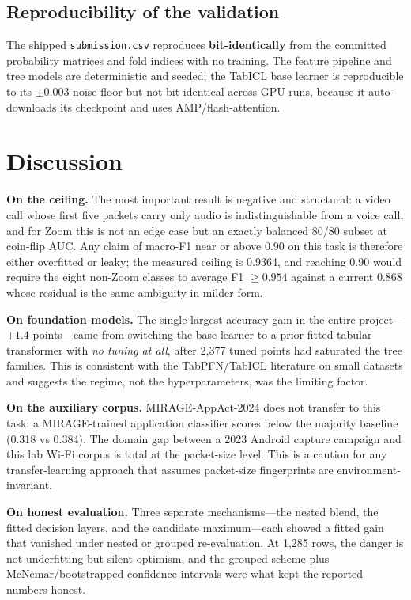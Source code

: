 \documentclass[11pt]{article}
\begin{document}
\subsection{Reproducibility of the validation}

The shipped \texttt{submission.csv} reproduces \textbf{bit-identically} from the committed probability
matrices and fold indices with no training. The feature pipeline and tree models are deterministic and
seeded; the TabICL base learner is reproducible to its $\pm 0.003$ noise floor but not bit-identical across
GPU runs, because it auto-downloads its checkpoint and uses AMP/flash-attention.

\section{Discussion}

\textbf{On the ceiling.} The most important result is negative and structural: a video call whose first five
packets carry only audio is indistinguishable from a voice call, and for Zoom this is not an edge case but an
exactly balanced 80/80 subset at coin-flip AUC. Any claim of macro-F1 near or above 0.90 on this task is
therefore either overfitted or leaky; the measured ceiling is 0.9364, and reaching 0.90 would require the
eight non-Zoom classes to average F1 $\geq 0.954$ against a current 0.868 whose residual is the same
ambiguity in milder form.

\textbf{On foundation models.} The single largest accuracy gain in the entire project---$+1.4$ points---came
from switching the base learner to a prior-fitted tabular transformer with \emph{no tuning at all}, after
2{,}377 tuned points had saturated the tree families. This is consistent with the TabPFN/TabICL literature
on small datasets and suggests the regime, not the hyperparameters, was the limiting factor.

\textbf{On the auxiliary corpus.} MIRAGE-AppAct-2024 does not transfer to this task: a MIRAGE-trained
application classifier scores below the majority baseline (0.318 vs 0.384). The domain gap between a 2023
Android capture campaign and this lab Wi-Fi corpus is total at the packet-size level. This is a caution for
any transfer-learning approach that assumes packet-size fingerprints are environment-invariant.

\textbf{On honest evaluation.} Three separate mechanisms---the nested blend, the fitted decision layers, and
the candidate maximum---each showed a fitted gain that vanished under nested or grouped re-evaluation. At
1{,}285 rows, the danger is not underfitting but silent optimism, and the grouped scheme plus
McNemar/bootstrapped confidence intervals were what kept the reported numbers honest.
\end{document}

